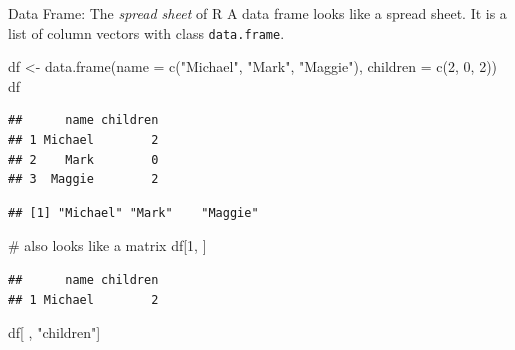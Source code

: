 \documentclass[
  9pt,
  ignorenonframetext,
]{beamer}
\newenvironment{Shaded}{\begin{snugshade}}{\end{snugshade}}
\newcommand{\CommentTok}[1]{\textcolor[rgb]{0.50,0.62,0.50}{#1}}
\newcommand{\DataTypeTok}[1]{\textcolor[rgb]{0.87,0.87,0.75}{#1}}
\newcommand{\DecValTok}[1]{\textcolor[rgb]{0.86,0.86,0.80}{#1}}
\newcommand{\KeywordTok}[1]{\textcolor[rgb]{0.94,0.87,0.69}{#1}}
\newcommand{\NormalTok}[1]{\textcolor[rgb]{0.80,0.80,0.80}{#1}}
\newcommand{\OperatorTok}[1]{\textcolor[rgb]{0.94,0.94,0.82}{#1}}
\newcommand{\StringTok}[1]{\textcolor[rgb]{0.80,0.58,0.58}{#1}}
\begin{document}
\begin{frame}[fragile]{Data Frame: The \emph{spread sheet} of R}
\protect\hypertarget{data-frame-the-spread-sheet-of-r}{}
A data frame looks like a spread sheet. It is a list of column vectors
with class \texttt{data.frame}.

\tiny
\vfill

\begin{Shaded}
\begin{Highlighting}[]
\NormalTok{df \textless{}{-}}\StringTok{ }\KeywordTok{data.frame}\NormalTok{(}\DataTypeTok{name =} \KeywordTok{c}\NormalTok{(}\StringTok{"Michael"}\NormalTok{, }\StringTok{"Mark"}\NormalTok{, }\StringTok{"Maggie"}\NormalTok{), }\DataTypeTok{children =} \KeywordTok{c}\NormalTok{(}\DecValTok{2}\NormalTok{, }\DecValTok{0}\NormalTok{, }\DecValTok{2}\NormalTok{))}
\NormalTok{df}
\end{Highlighting}
\end{Shaded}

\begin{verbatim}
##      name children
## 1 Michael        2
## 2    Mark        0
## 3  Maggie        2
\end{verbatim}

\begin{Shaded}
\end{Shaded}

\begin{verbatim}
## [1] "Michael" "Mark"    "Maggie"
\end{verbatim}

\begin{Shaded}
\begin{Highlighting}[]
\CommentTok{\# also looks like a matrix}
\NormalTok{df[}\DecValTok{1}\NormalTok{, ]     }
\end{Highlighting}
\end{Shaded}

\begin{verbatim}
##      name children
## 1 Michael        2
\end{verbatim}

\begin{Shaded}
\begin{Highlighting}[]
\NormalTok{df[ , }\StringTok{"children"}\NormalTok{]}
\end{Highlighting}
\end{Shaded}


\end{frame}
\end{document}

